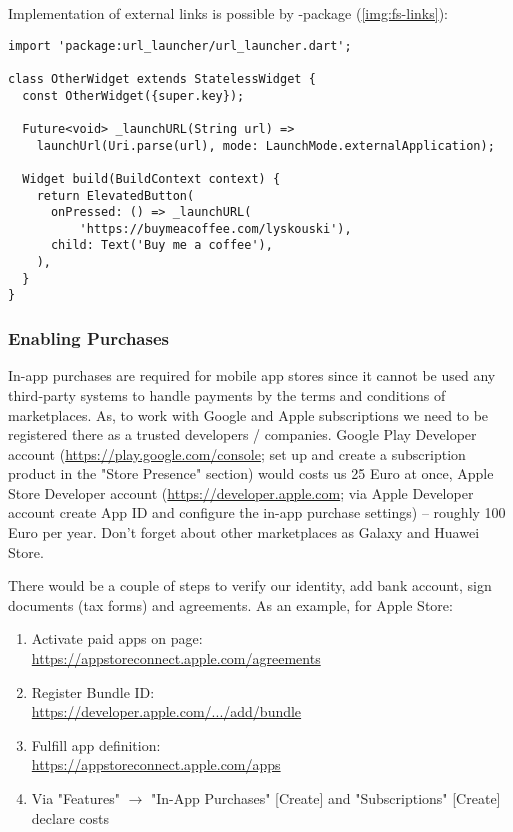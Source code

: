
\noindent Implementation of external links  is possible by -package (\cref{img:fs-links}):

\begin{lstlisting}
import 'package:url_launcher/url_launcher.dart';

class OtherWidget extends StatelessWidget {
  const OtherWidget({super.key});

  Future<void> _launchURL(String url) =>
    launchUrl(Uri.parse(url), mode: LaunchMode.externalApplication);

  Widget build(BuildContext context) {
    return ElevatedButton(
      onPressed: () => _launchURL(
          'https://buymeacoffee.com/lyskouski'),
      child: Text('Buy me a coffee'),
    ),
  }
}
\end{lstlisting}


\subsubsection{Enabling Purchases}

In-app purchases are required for mobile app stores since it cannot be used any third-party systems to handle payments
by the terms and conditions of marketplaces. As, to work with Google and Apple subscriptions we need to be registered 
there as a trusted developers / companies. Google Play Developer account 
(\href{https://play.google.com/console}{https://play.google.com/console}; set up and create a subscription product in 
the "Store Presence" section) would costs us 25 Euro at once, Apple Store Developer account 
(\href{https://developer.apple.com}{https://developer.apple.com}; via Apple Developer account create App ID and 
configure the in-app purchase settings) -- roughly 100 Euro per year. Don't forget about other marketplaces as 
Galaxy and Huawei Store.

There would be a couple of steps to verify our identity, add bank account, sign documents (tax forms) and agreements.
As an example, for Apple Store:
\begin{enumerate}
  \item Activate paid apps on page:\\
  \href{https://appstoreconnect.apple.com/agreements}{https://appstoreconnect.apple.com/agreements}
  \item Register Bundle ID:\\
  \href{https://developer.apple.com/account/resources/identifiers/bundleId/add/bundle}{https://developer.apple.com/.../add/bundle}
  \item Fulfill app definition:\\
  \href{https://appstoreconnect.apple.com/apps}{https://appstoreconnect.apple.com/apps}
  \item Via "Features" $\rightarrow$ "In-App Purchases" [Create] and "Subscriptions" [Create] declare costs
\end{enumerate}

